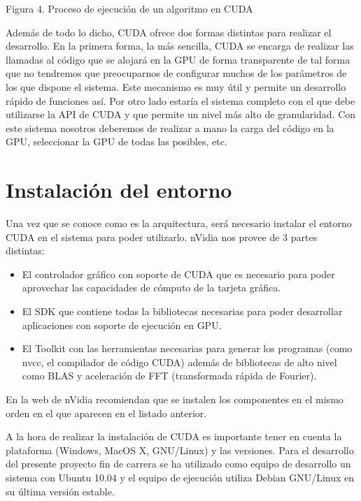 Figura 4. Proceso de ejecución de un algoritmo en CUDA

Además de todo lo dicho, CUDA ofrece dos formas distintas para realizar el desarrollo. En la primera forma, la más sencilla, CUDA se encarga de realizar las llamadas al código que se alojará en la GPU de forma transparente de tal forma que no tendremos que preocuparnos de configurar muchos de los parámetros de los que dispone el sistema. Este mecanismo es muy útil y permite un desarrollo rápido de funciones así. Por otro lado estaría el sistema completo con el que debe utilizarse la API de CUDA y que permite un nivel más alto de granularidad. Con este sistema nosotros deberemos de realizar a mano la carga del código en la GPU, seleccionar la GPU de todas las posibles, etc.

\section{Instalación del entorno}

Una vez que se conoce como es la arquitectura, será necesario instalar el entorno CUDA en el sistema para poder utilizarlo. nVidia nos provee de 3 partes distintas:

\begin{itemize}
	\item El controlador gráfico con soporte de CUDA que es necesario para poder aprovechar las capacidades de cómputo de la tarjeta gráfica.
	\item El SDK que contiene todas la bibliotecas necesarias para poder desarrollar aplicaciones con soporte de ejecución en GPU.
	\item El Toolkit con las herramientas necesarias para generar los programas (como nvcc, el compilador de código CUDA) además de bibliotecas de alto nivel como BLAS y aceleración de FFT (transformada rápida de Fourier).
\end{itemize}

En la web de nVidia recomiendan que se instalen los componentes en el mismo orden en el que aparecen en el listado anterior.

A la hora de realizar la instalación de CUDA es importante tener en cuenta la plataforma (Windows, MacOS X, GNU/Linux) y las versiones. Para el desarrollo del presente proyecto fin de carrera se ha utilizado como equipo de desarrollo un sistema con Ubuntu 10.04 y el equipo de ejecución utiliza Debian GNU/Linux en su última versión estable.
